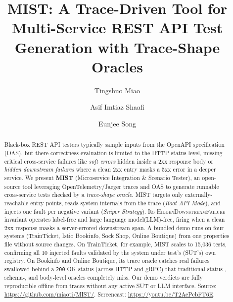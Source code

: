 \documentclass[sigconf,screen,review]{acmart}
\begin{document}
\title{MIST: A Trace-Driven Tool for Multi-Service REST API Test Generation with Trace-Shape Oracles}

\author{Tingshuo Miao}

\author{Asif Imtiaz Shaafi}

\author{Eunjee Song}

\begin{abstract}
Black-box REST API testers typically sample inputs from the OpenAPI specification (OAS), but there correctness evaluation is limited to the HTTP status level, missing critical cross-service failures like \emph{soft errors} hidden inside a 2xx response body or \emph{hidden downstream failures} where a clean 2xx entry masks a 5xx error in a deeper service. We present \textbf{MIST} (Microservice Integration \& Scenario Tester), an open-source tool leveraging OpenTelemetry/Jaeger traces and OAS to generate runnable cross-service tests checked by a \emph{trace-shape oracle}. MIST targets only externally-reachable entry points, reads system internals from the trace (\emph{Root API Mode}), and injects one fault per negative variant (\emph{Sniper Strategy}). Its \textsc{HiddenDownstreamFailure} invariant operates label-free and large language model(LLM)-free, firing when a clean 2xx response masks a server-errored downstream span. A bundled demo runs on four systems (TrainTicket, Istio Bookinfo, Sock Shop, Online Boutique) from one properties file without source changes. On TrainTicket, for example, MIST scales to 15{,}036 tests, confirming all 10 injected faults validated by the system under test's (SUT's) own registry. On Bookinfo and Online Boutique, its trace oracle catches real failures swallowed behind a \texttt{200} OK status (across HTTP and gRPC) that traditional status-, schema-, and body-level oracles completely miss. Our demo verdicts are fully reproducible offline from traces without any active SUT or LLM interface. Source: \url{https://github.com/miaoti/MIST/}. Screencast: \url{https://youtu.be/T2AePcbFT6E}.
\end{abstract}
\end{document}
